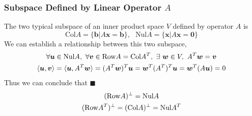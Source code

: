 \documentclass[11pt]{article}
\begin{document}
\subsubsection*{Subspace Defined by Linear Operator $A$}
The two typical subspace of an inner product space $V$ defined by operator $A$ is
\begin{equation}
    \text{Col}A = \{\bm{b} | A\bm{x} = \bm{b} \},~~~\text{Nul}A = \{\bm{x} | A\bm{x} = \bm{0} \}
\end{equation}
We can establish a relationship between this two subspace,
\begin{gather}
    \forall \bm{u} \in \text{Nul}A,~\forall \bm{v} \in \text{Row}A = \text{Col}A^{T},~\exists~\bm{w} \in V,~A^{T}\bm{w} = \bm{v} \notag \\
    \langle \bm{u},\bm{v} \rangle = \langle \bm{u}, A^T\bm{w} \rangle = (A^T\bm{w})^T \bm{u} = \bm{w}^T(A^T)^T\bm{u} = \bm{w}^T (A\bm{u}) = 0 \notag
\end{gather}
Thus we can conclude that \hfill $\blacksquare$
\begin{gather}
    (\text{Row}A)^\perp = \text{Nul}A \notag \\
    (\text{Row}A^T)^\perp = (\text{Col}A)^\perp = \text{Nul}A^T  \notag 
\end{gather}
\end{document}
